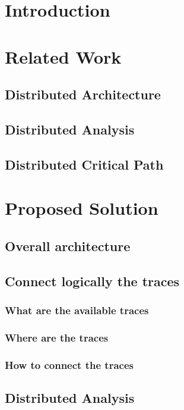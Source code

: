 \label{sec:architecture}

\section{Introduction}

\section{Related Work}


\subsection{Distributed Architecture}

\subsection{Distributed Analysis}

\subsection{Distributed Critical Path}

\section{Proposed Solution}
\subsection{Overall architecture}
\subsection{Connect logically the traces}
\subsubsection{What are the available traces}
\subsubsection{Where are the traces}
\subsubsection{How to connect the traces}

\subsection{Distributed Analysis}

